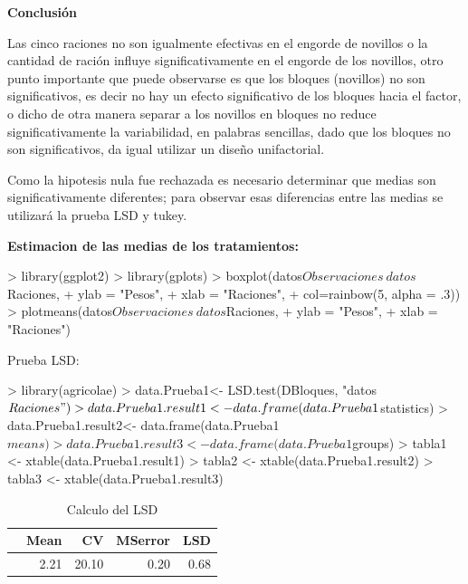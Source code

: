 \documentclass[12pt,letterpaper]{report}
\begin{document}
\textbf{Conclusión}

Las cinco raciones no son igualmente efectivas en el engorde de novillos o la cantidad de
ración influye significativamente en el engorde de los novillos, otro punto importante que puede observarse es que los bloques (novillos) no son significativos, es decir no hay un efecto significativo de los bloques hacia el factor, o dicho de otra manera separar a los novillos en bloques no reduce significativamente la variabilidad, en palabras sencillas, dado que los bloques no son significativos, da igual utilizar un diseño unifactorial.

Como la hipotesis nula fue rechazada es necesario determinar
que medias son significativamente diferentes; para observar esas diferencias entre las medias
se utilizará la prueba LSD y tukey.

\textbf{Estimacion de las medias de los tratamientos:}
\begin{Schunk}
\begin{Sinput}
> library(ggplot2)
> library(gplots)
> boxplot(datos$Observaciones~datos$Raciones,
+         ylab = "Pesos",
+         xlab = "Raciones",
+         col=rainbow(5, alpha = .3))
> plotmeans(datos$Observaciones~datos$Raciones,
+           ylab = "Pesos",
+           xlab = "Raciones")
\end{Sinput}
\end{Schunk}

Prueba LSD:
\begin{Schunk}
\begin{Sinput}
> library(agricolae)
> data.Prueba1<- LSD.test(DBloques, "datos$Raciones")
> data.Prueba1.result1<- data.frame(data.Prueba1$statistics)
> data.Prueba1.result2<- data.frame(data.Prueba1$means)
> data.Prueba1.result3<- data.frame(data.Prueba1$groups)
> tabla1 <- xtable(data.Prueba1.result1)
> tabla2 <- xtable(data.Prueba1.result2)
> tabla3 <- xtable(data.Prueba1.result3)
\end{Sinput}
\end{Schunk}

\begin{table}[ht]
\centering
\begin{tabular}{rrrrr}
  \hline
 & Mean & CV & MSerror & LSD \\ 
  \hline
  & 2.21 & 20.10 & 0.20 & 0.68 \\ 
   \hline
\end{tabular}
\caption{Calculo del LSD}
\end{table}
\end{document}
